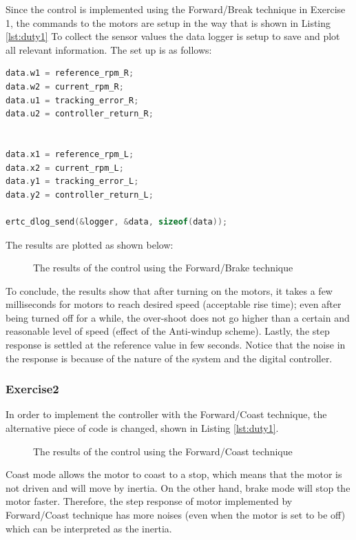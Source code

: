 \documentclass[english]{article}
\begin{document}
\newpage
Since the control is implemented using the Forward/Break 
technique in Exercise 1, the commands to the motors are setup in
 the way that is shown in Listing \ref{lst:duty1}  To collect the sensor values the data logger is setup to save and plot all relevant information.
   The set up is as follows: 
\begin{lstlisting}[language=C, caption={setting up data logger}, label={lst:date} ]
data.w1 = reference_rpm_R;
data.w2 = current_rpm_R;
data.u1 = tracking_error_R;
data.u2 = controller_return_R;


data.x1 = reference_rpm_L;
data.x2 = current_rpm_L;
data.y1 = tracking_error_L;
data.y2 = controller_return_L;

ertc_dlog_send(&logger, &data, sizeof(data));  
\end{lstlisting}
The results are plotted as shown below:
\begin{figure}[tbh]
    \centering
    
    \caption{The results of the control using the Forward/Brake technique}
    \label{fig:b2}
\end{figure}
\newpage
To conclude, the results show that after turning on the motors, 
it takes a few milliseconds for motors to reach desired speed 
(acceptable rise time); even after being turned off for a while,
 the over-shoot does not go higher than a certain and reasonable
  level of speed (effect of the Anti-windup scheme). Lastly, the
   step response is settled at the reference value in few seconds.
    Notice that the noise in the response is because of the nature of
    the system and the digital controller. 
\subsubsection{Exercise2}
In order to implement the controller with the Forward/Coast 
technique,  the alternative piece of code is changed,
 shown in Listing \ref{lst:duty1}. 
 \begin{figure}[tbh]
    \centering
    
    \caption{The results of the control using the Forward/Coast technique }
    \label{fig:b3}
\end{figure}\newline
Coast mode allows the motor to coast to a stop, which means that the motor 
is not driven and will move by inertia. On the other hand, brake mode will 
stop the motor faster. Therefore, the step response of motor implemented by
Forward/Coast technique has more noises (even when the motor is set to be off)
which can be interpreted as the inertia.  
\end{document}
